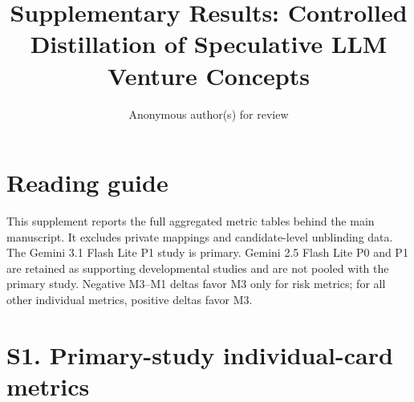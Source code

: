 \documentclass[10pt]{article}
\title{Supplementary Results: Controlled Distillation of Speculative LLM Venture Concepts}
\author{Anonymous author(s) for review}
\date{}
\begin{document}
\maketitle
\section*{Reading guide}
This supplement reports the full aggregated metric tables behind the main manuscript.
It excludes private mappings and candidate-level unblinding data. The Gemini 3.1 Flash
Lite P1 study is primary. Gemini 2.5 Flash Lite P0 and P1 are retained as supporting
developmental studies and are not pooled with the primary study. Negative M3--M1
deltas favor M3 only for risk metrics; for all other individual metrics, positive
deltas favor M3.

\section*{S1. Primary-study individual-card metrics}
\end{document}
